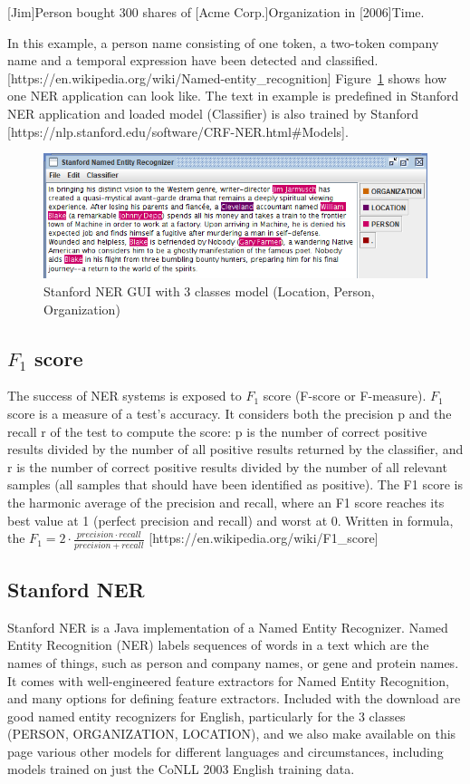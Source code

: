 \documentclass[thesis=M,english]{FITthesis}[2018/05/30]
\begin{document}
[Jim]Person bought 300 shares of [Acme Corp.]Organization in [2006]Time.

In this example, a person name consisting of one token, a two-token company name and a temporal expression have been detected and classified.
[https://en.wikipedia.org/wiki/Named-entity\_recognition]
\linebreak Figure~\ref{fig:StanfordNER} shows how one NER application can look like. The text in example is predefined in Stanford NER application and loaded model (Classifier) is also trained by Stanford [https://nlp.stanford.edu/software/CRF-NER.html\#Models].

	\begin{figure}[H]\centering
		\includegraphics[width=\textwidth]{NER-Stanford}
		\caption{Stanford NER GUI with 3 classes model (Location, Person, Organization)}\label{fig:StanfordNER}
	\end{figure}
	
\subsection{$F_{1}$ score}
The success of NER systems is exposed to $F_{1}$ score (F-score or F-measure). $F_{1}$ score  is a measure of a test's accuracy. It considers both the precision p  and the recall r of the test to compute the score: p is the number of correct positive results divided by the number of all positive results returned by the classifier, and r is the number of correct positive results divided by the number of all relevant samples (all samples that should have been identified as positive). The F1 score is the harmonic average of the precision and recall, where an F1 score reaches its best value at 1 (perfect precision and recall) and worst at 0. 
Written in formula, the $F_{1} =2\cdot \frac{precision \cdot recall}{precision + recall}$ [https://en.wikipedia.org/wiki/F1\_score]


\subsection{Stanford NER}\label{Stanford NER}
Stanford NER is a Java implementation of a Named Entity Recognizer. Named Entity Recognition (NER) labels sequences of words in a text which are the names of things, such as person and company names, or gene and protein names. It comes with well-engineered feature extractors for Named Entity Recognition, and many options for defining feature extractors. Included with the download are good named entity recognizers for English, particularly for the 3 classes (PERSON, ORGANIZATION, LOCATION), and we also make available on this page various other models for different languages and circumstances, including models trained on just the CoNLL 2003 English training data.
\end{document}
